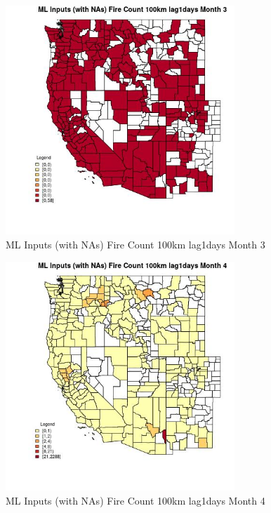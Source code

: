 \begin{figure} 
\centering  
\includegraphics[width=0.77\textwidth]{Code_Outputs/Report_ML_input_PM25_Step4_part_e_de_duplicated_aves_compiled_2019-05-21wNAs_CountyFire_Count_100km_lag1daysmedianMonth3.jpg} 
\caption{\label{fig:Report_ML_input_PM25_Step4_part_e_de_duplicated_aves_compiled_2019-05-21wNAsCountyFire_Count_100km_lag1daysmedianMonth3}ML Inputs (with NAs) Fire Count 100km lag1days Month 3} 
\end{figure} 
 

\begin{figure} 
\centering  
\includegraphics[width=0.77\textwidth]{Code_Outputs/Report_ML_input_PM25_Step4_part_e_de_duplicated_aves_compiled_2019-05-21wNAs_CountyFire_Count_100km_lag1daysmedianMonth4.jpg} 
\caption{\label{fig:Report_ML_input_PM25_Step4_part_e_de_duplicated_aves_compiled_2019-05-21wNAsCountyFire_Count_100km_lag1daysmedianMonth4}ML Inputs (with NAs) Fire Count 100km lag1days Month 4} 
\end{figure} 
 

